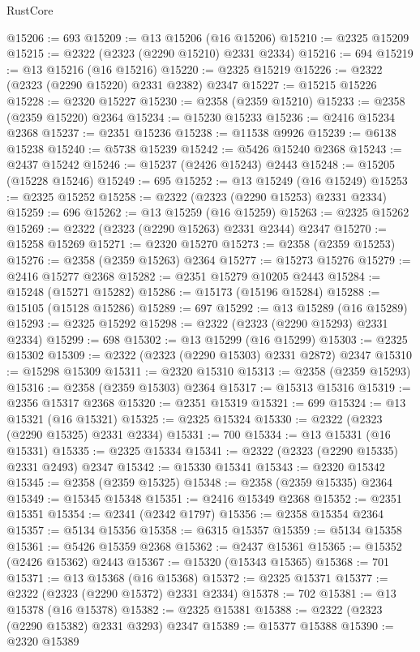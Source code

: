 \begin{lexlean}{RustCore}
\begin{coremodule}
@15206 := 693
@15209 := @13 @15206 (@16 @15206)
@15210 := @2325 @15209
@15215 := @2322 (@2323 (@2290 @15210) @2331 @2334)
@15216 := 694
@15219 := @13 @15216 (@16 @15216)
@15220 := @2325 @15219
@15226 := @2322 (@2323 (@2290 @15220) @2331 @2382) @2347
@15227 := @15215 @15226
@15228 := @2320 @15227
@15230 := @2358 (@2359 @15210)
@15233 := @2358 (@2359 @15220) @2364
@15234 := @15230 @15233
@15236 := @2416 @15234 @2368
@15237 := @2351 @15236
@15238 := @11538 @9926
@15239 := @6138 @15238
@15240 := @5738 @15239
@15242 := @5426 @15240 @2368
@15243 := @2437 @15242
@15246 := @15237 (@2426 @15243) @2443
@15248 := @15205 (@15228 @15246)
@15249 := 695
@15252 := @13 @15249 (@16 @15249)
@15253 := @2325 @15252
@15258 := @2322 (@2323 (@2290 @15253) @2331 @2334)
@15259 := 696
@15262 := @13 @15259 (@16 @15259)
@15263 := @2325 @15262
@15269 := @2322 (@2323 (@2290 @15263) @2331 @2344) @2347
@15270 := @15258 @15269
@15271 := @2320 @15270
@15273 := @2358 (@2359 @15253)
@15276 := @2358 (@2359 @15263) @2364
@15277 := @15273 @15276
@15279 := @2416 @15277 @2368
@15282 := @2351 @15279 @10205 @2443
@15284 := @15248 (@15271 @15282)
@15286 := @15173 (@15196 @15284)
@15288 := @15105 (@15128 @15286)
@15289 := 697
@15292 := @13 @15289 (@16 @15289)
@15293 := @2325 @15292
@15298 := @2322 (@2323 (@2290 @15293) @2331 @2334)
@15299 := 698
@15302 := @13 @15299 (@16 @15299)
@15303 := @2325 @15302
@15309 := @2322 (@2323 (@2290 @15303) @2331 @2872) @2347
@15310 := @15298 @15309
@15311 := @2320 @15310
@15313 := @2358 (@2359 @15293)
@15316 := @2358 (@2359 @15303) @2364
@15317 := @15313 @15316
@15319 := @2356 @15317 @2368
@15320 := @2351 @15319
@15321 := 699
@15324 := @13 @15321 (@16 @15321)
@15325 := @2325 @15324
@15330 := @2322 (@2323 (@2290 @15325) @2331 @2334)
@15331 := 700
@15334 := @13 @15331 (@16 @15331)
@15335 := @2325 @15334
@15341 := @2322 (@2323 (@2290 @15335) @2331 @2493) @2347
@15342 := @15330 @15341
@15343 := @2320 @15342
@15345 := @2358 (@2359 @15325)
@15348 := @2358 (@2359 @15335) @2364
@15349 := @15345 @15348
@15351 := @2416 @15349 @2368
@15352 := @2351 @15351
@15354 := @2341 (@2342 @1797)
@15356 := @2358 @15354 @2364
@15357 := @5134 @15356
@15358 := @6315 @15357
@15359 := @5134 @15358
@15361 := @5426 @15359 @2368
@15362 := @2437 @15361
@15365 := @15352 (@2426 @15362) @2443
@15367 := @15320 (@15343 @15365)
@15368 := 701
@15371 := @13 @15368 (@16 @15368)
@15372 := @2325 @15371
@15377 := @2322 (@2323 (@2290 @15372) @2331 @2334)
@15378 := 702
@15381 := @13 @15378 (@16 @15378)
@15382 := @2325 @15381
@15388 := @2322 (@2323 (@2290 @15382) @2331 @3293) @2347
@15389 := @15377 @15388
@15390 := @2320 @15389

\end{coremodule}
\end{lexlean}
